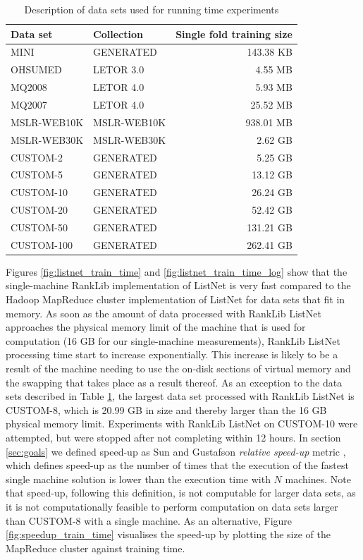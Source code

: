 \begin{table}
\centering
\begin{tabular}{p{3.4cm}p{3.4cm}r}\toprule
Data set & Collection & Single fold training size \\
\midrule
MINI		& GENERATED		  & 143.38 KB\\
OHSUMED     & LETOR 3.0       &   4.55 MB\\
MQ2008      & LETOR 4.0       &   5.93 MB\\
MQ2007      & LETOR 4.0       &  25.52 MB\\
MSLR-WEB10K & MSLR-WEB10K     & 938.01 MB\\
MSLR-WEB30K & MSLR-WEB30K     &   2.62 GB\\
CUSTOM-2	& GENERATED		  &   5.25 GB\\
CUSTOM-5	& GENERATED		  &  13.12 GB\\
CUSTOM-10	& GENERATED		  &  26.24 GB\\
CUSTOM-20   & GENERATED       &  52.42 GB\\
CUSTOM-50	& GENERATED		  & 131.21 GB\\
CUSTOM-100	& GENERATED		  & 262.41 GB\\
\bottomrule
\end{tabular}
\caption{Description of data sets used for running time experiments}
\label{tbl:recap_datasets}
\end{table}

Figures \ref{fig:listnet_train_time} and \ref{fig:listnet_train_time_log} show that the single-machine RankLib implementation of ListNet is very fast compared to the Hadoop MapReduce cluster implementation of ListNet for data sets that fit in memory. As soon as the amount of data processed with RankLib ListNet approaches the physical memory limit of the machine that is used for computation (16 GB for our single-machine measurements), RankLib ListNet processing time start to increase exponentially. This increase is likely to be a result of the machine needing to use the on-disk sections of virtual memory and the swapping that takes place as a result thereof. As an exception to the data sets described in Table \ref{tbl:recap_datasets}, the largest data set processed with RankLib ListNet is CUSTOM-8, which is 20.99 GB in size and thereby larger than the 16 GB physical memory limit. Experiments with RankLib ListNet on CUSTOM-10 were attempted, but were stopped after not completing within 12 hours. In section \ref{sec:goals} we defined speed-up as Sun and Gustafson \emph{relative speed-up} metric \cite{Sun1991}, which defines speed-up as the number of times that the execution of the fastest single machine solution is lower than the execution time with $N$ machines. Note that speed-up, following this definition, is not computable for larger data sets, as it is not computationally feasible to perform computation on data sets larger than CUSTOM-8 with a single machine. As an alternative, Figure \ref{fig:speedup_train_time} visualises the speed-up by plotting the size of the MapReduce cluster against training time.\\


